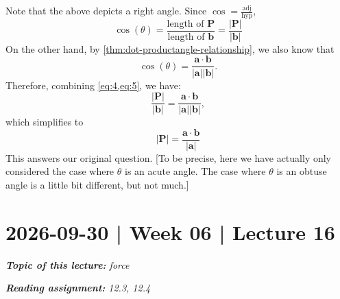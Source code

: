 \documentclass[10pt]{article}
\theoremstyle{definition}
\newcommand{\1}[1]{\textbf{1}_{\left[#1\right]}} %
\begin{document}
\begin{center}
\end{center}
Note that the above depicts a right angle. Since $\cos = \frac{\text{adj}}{\text{hyp}}$,
\begin{equation}
  \label{eq:4}
  \cos(\theta) = \frac{\text{length of }\mathbf{P}}{\text{length of }\mathbf{b}} = \frac{|\mathbf{P}|}{|\mathbf{b}|}
\end{equation}
On the other hand, by \cref{thm:dot-productangle-relationship}, we also know that
\begin{equation}
  \label{eq:5}
  \cos(\theta) = \frac{\mathbf{a}\cdot \mathbf{b}}{|\mathbf{a}||\mathbf{b}|}.
\end{equation}
Therefore, combining \cref{eq:4,eq:5}, we have:
\begin{equation*}
  \frac{|\mathbf{P}|}{|\mathbf{b}|} =  \frac{\mathbf{a}\cdot \mathbf{b}}{|\mathbf{a}||\mathbf{b}|},
\end{equation*}
which simplifies to
\begin{equation*}
  \boxed{|\mathbf{P}| =  \frac{\mathbf{a}\cdot \mathbf{b}}{|\mathbf{a}|}}
\end{equation*}
This answers our original question. [To be precise, here we have actually only
considered the case where $\theta$ is an acute angle. The case where $\theta$
is an obtuse angle is a little bit different, but not much.]

\newpage

\section{2026-09-30 | Week 06 | Lecture 16}
\begin{center}
  \begin{tcolorbox}[width=0.9\textwidth, colback=white, colframe=black]
    \textit{\textbf{Topic of this lecture:} force}

    \textit{\textbf{Reading assignment:} 12.3, 12.4}
  \end{tcolorbox}
\end{center}
\end{document}
